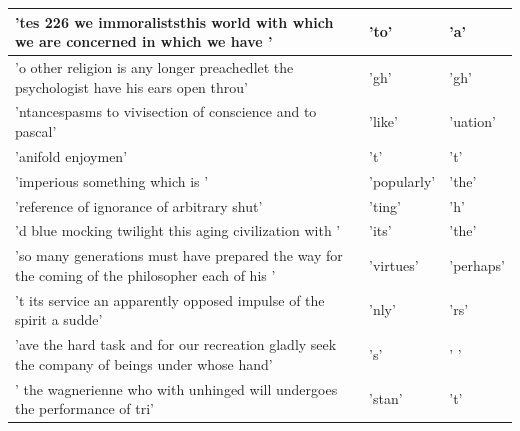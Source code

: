 \documentclass[11pt,a4paper,bibliography=totocnumbered,listof=totocnumbered]{scrartcl}
\begin{document}
\begin{table}[H]
\begin{tabularx}{\textwidth}{X|X|X}
\hline 
'tes  226 we immoraliststhis world with which we are concerned in which we have ' & 'to' & 'a' \\ 
\hline 
'o other religion is any longer preachedlet the psychologist have his ears open throu' & 'gh' & 'gh' \\ 
\hline 
'ntancespasms to vivisection of conscience and to pascal' & 'like' & 'uation' \\ 
\hline 
'anifold enjoymen' & 't' & 't' \\ 
\hline 
'imperious something which is ' & 'popularly' & 'the' \\ 
\hline 
'reference of ignorance of arbitrary shut' & 'ting' & 'h' \\ 
\hline 
'd blue mocking twilight this aging civilization with ' & 'its' & 'the' \\ 
\hline 
'so many generations must have prepared the way for the coming of the philosopher each of his ' & 'virtues' & 'perhaps' \\ 
\hline 
't its service an apparently opposed impulse of the spirit a sudde' & 'nly' & 'rs' \\ 
\hline 
'ave the hard task and for our recreation gladly seek the company of beings under whose hand' & 's' & ' ' \\ 
\hline 
' the wagnerienne who with unhinged will undergoes the performance of tri' & 'stan' & 't' \\ 
\hline 
\end{tabularx}
   \vskip 1pt
\end{table} 



\renewcommand\refname{Literature}


\pagebreak
\end{document}
